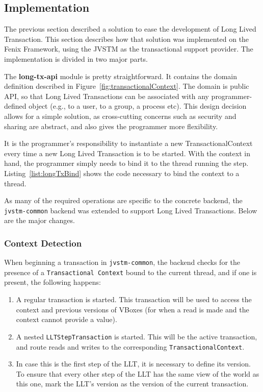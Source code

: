 \documentclass{llncs}
\begin{document}
\subsection{Implementation}
\label{sec:impl}


The previous section described a solution to ease the development of
Long Lived Transaction. This section describes how that solution was
implemented on the Fenix Framework, using the JVSTM as the
transactional support provider. The implementation is divided in two
major parts.

The {\bf long-tx-api} module is pretty straightforward. It contains
the domain definition described in
Figure~\ref{fig:transactionalContext}. The domain is public API, so
that Long Lived Transactions can be associated with any
programmer-defined object (e.g., to a user, to a group, a process
etc). This design decision allows for a simple solution, as
cross-cutting concerns such as security and sharing are abstract, and
also gives the programmer more flexibility.

It is the programmer's responsibility to instantiate a new
TransactionalContext every time a new Long Lived Transaction is to be
started. With the context in hand, the programmer simply needs to bind
it to the thread running the step. Listing~\ref{list:longTxBind} shows
the code necessary to bind the context to a thread.

As many of the required operations are specific to the concrete
backend, the \texttt{jvstm-common} backend was extended to support
Long Lived Transactions. Below are the major changes.

\subsubsection{Context Detection}

When beginning a transaction in \texttt{jvstm-common}, the backend
checks for the presence of a \texttt{Transactional Context} bound to
the current thread, and if one is present, the following happens:

\begin{enumerate}

\item A regular transaction is started. This transaction will be used
  to access the context and previous versions of VBoxes (for when a
  read is made and the context cannot provide a value).

\item A nested \texttt{LLTStepTransaction} is started. This will be the
  active transaction, and route reads and writes to the corresponding
  \texttt{TransactionalContext}.

\item In case this is the first step of the LLT, it is necessary to
  define its version. To ensure that every other step of the LLT has
  the same view of the world as this one, mark the LLT's version as
  the version of the current transaction.

\end{enumerate}
\end{document}
